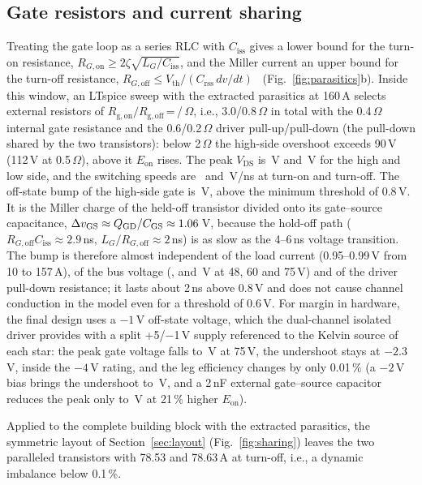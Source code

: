 \documentclass[conference]{IEEEtran}
\begin{document}
\subsection{Gate resistors and current sharing}
Treating the gate loop as a series RLC with $C_\mathrm{iss}$ gives a lower bound for the turn-on resistance, $R_{G,\mathrm{on}}\geq2\zeta\sqrt{L_G/C_\mathrm{iss}}$, and the Miller current an upper bound for the turn-off resistance, $R_{G,\mathrm{off}}\leq V_\mathrm{th}/(C_\mathrm{rss}\,dv/dt)$~\cite{tran2025} (Fig.~\ref{fig:parasitics}b). Inside this window, an LTspice sweep with the extracted parasitics at 160\,A selects external resistors of $R_\mathrm{g,on}/R_\mathrm{g,off}$\,=\,\RgOn/\RgOff\,$\Omega$, i.e., 3.0/0.8\,$\Omega$ in total with the 0.4\,$\Omega$ internal gate resistance and the 0.6/0.2\,$\Omega$ driver pull-up/pull-down (the pull-down shared by the two transistors): below 2\,$\Omega$ the high-side overshoot exceeds 90\,V (112\,V at 0.5\,$\Omega$), above it $E_\mathrm{on}$ rises. The peak $V_\mathrm{DS}$ is \VdsH\,V and \VdsL\,V for the high and low side, and the switching speeds are \DvdtOn\ and \DvdtOff\,V/ns at turn-on and turn-off. The off-state bump of the high-side gate is \VgsBump\,V, above the minimum threshold of 0.8\,V. It is the Miller charge of the held-off transistor divided onto its gate--source capacitance, $\Delta v_\mathrm{GS}\approx Q_\mathrm{GD}/C_\mathrm{GS}\approx1.06$\,V, because the hold-off path ($R_{G,\mathrm{off}}C_\mathrm{iss}\approx2.9$\,ns, $L_G/R_{G,\mathrm{off}}\approx2$\,ns) is as slow as the 4--6\,ns voltage transition. The bump is therefore almost independent of the load current (0.95--0.99\,V from 10 to 157\,A), of the bus voltage (\BmpFortyEight, \BmpSixty{} and \BmpSeventyFive\,V at 48, 60 and 75\,V) and of the driver pull-down resistance; it lasts about 2\,ns above 0.8\,V and does not cause channel conduction in the model even for a threshold of 0.6\,V. For margin in hardware, the final design uses a $-1$\,V off-state voltage, which the dual-channel isolated driver provides with a split +5/$-$1\,V supply referenced to the Kelvin source of each star: the peak gate voltage falls to \BmpNegOneSF\,V at 75\,V, the undershoot stays at $-2.3$\,V, inside the $-4$\,V rating, and the leg efficiency changes by only 0.01\,\% (a $-2$\,V bias brings the undershoot to \VgsMinNegTwo\,V, and a 2\,nF external gate--source capacitor reduces the peak only to \BmpCTwoSF\,V at 21\,\% higher $E_\mathrm{on}$).

Applied to the complete building block with the extracted parasitics, the symmetric layout of Section~\ref{sec:layout} (Fig.~\ref{fig:sharing}) leaves the two paralleled transistors with 78.53 and 78.63\,A at turn-off, i.e., a dynamic imbalance below 0.1\,\%.
\end{document}
